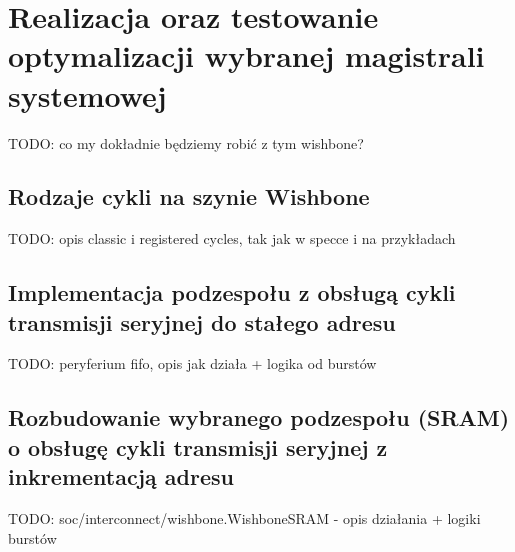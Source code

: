 \section{Realizacja oraz testowanie optymalizacji wybranej magistrali systemowej}
TODO: co my dokładnie będziemy robić z tym wishbone?

\subsection{Rodzaje cykli na szynie Wishbone}
TODO: opis classic i registered cycles, tak jak w specce i na przykładach

\subsection{Implementacja podzespołu z obsługą cykli transmisji seryjnej do stałego adresu}
TODO: peryferium fifo, opis jak działa + logika od burstów

\subsection{Rozbudowanie wybranego podzespołu (SRAM) o obsługę cykli transmisji seryjnej z inkrementacją adresu}
TODO: soc/interconnect/wishbone.WishboneSRAM - opis działania + logiki burstów